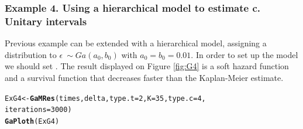 \documentclass[letterpaper]{article}\usepackage[]{graphicx}\usepackage[]{color}
\makeatletter
\newcommand{\hlnum}[1]{\textcolor[rgb]{0.686,0.059,0.569}{#1}}%
\newcommand{\hlstd}[1]{\textcolor[rgb]{0.345,0.345,0.345}{#1}}%
\newcommand{\hlkwb}[1]{\textcolor[rgb]{0.69,0.353,0.396}{#1}}%
\newcommand{\hlkwc}[1]{\textcolor[rgb]{0.333,0.667,0.333}{#1}}%
\newcommand{\hlkwd}[1]{\textcolor[rgb]{0.737,0.353,0.396}{\textbf{#1}}}%
\newenvironment{kframe}{%
 \def\at@end@of@kframe{}%
 \ifinner\ifhmode%
  \def\at@end@of@kframe{\end{minipage}}%
  \begin{minipage}{\columnwidth}%
 \fi\fi%
 \def\FrameCommand##1{\hskip\@totalleftmargin \hskip-\fboxsep
 \colorbox{shadecolor}{##1}\hskip-\fboxsep
     \hskip-\linewidth \hskip-\@totalleftmargin \hskip\columnwidth}%
 \MakeFramed {\advance\hsize-\width
   \@totalleftmargin\z@ \linewidth\hsize
   \@setminipage}}%
 {\par\unskip\endMakeFramed%
 \at@end@of@kframe}
\newenvironment{knitrout}{}{} %
\makeatother
\begin{document}
\subsubsection{Example 4. Using a hierarchical model to estimate c. Unitary intervals}

Previous example can be extended with a hierarchical model, assigning a distribution to $\epsilon ~ \sim Ga(a_0,b_0)$ with $a_0=b_0=0.01$. In order to set up the model we should set . The result displayed on Figure \ref{fig:G4} is a soft hazard function and a survival function that decreases faster than the Kaplan-Meier estimate.

\begin{knitrout}
\color{fgcolor}\begin{kframe}
\begin{alltt}
\hlstd{ExG4} \hlkwb{<-} \hlkwd{GaMRes}\hlstd{(times, delta,} \hlkwc{type.t} \hlstd{=} \hlnum{2}\hlstd{,} \hlkwc{K} \hlstd{=} \hlnum{35}\hlstd{,} \hlkwc{type.c} \hlstd{=} \hlnum{4}\hlstd{,}
               \hlkwc{iterations} \hlstd{=} \hlnum{3000}\hlstd{)}
\hlkwd{GaPloth}\hlstd{(ExG4)}
\end{alltt}
\end{kframe}
\end{knitrout}
\end{document}
